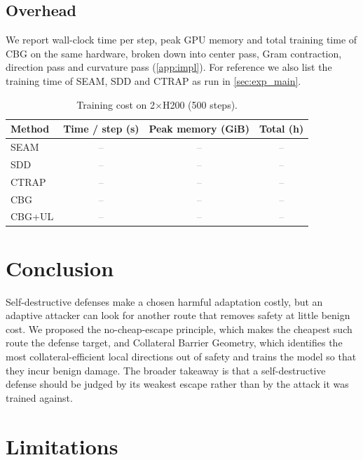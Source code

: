 \documentclass[11pt]{article}
\newcommand{\tbd}{\textcolor{gray}{--}}
\begin{document}
\subsection{Overhead}
\label{sec:overhead}

We report wall-clock time per step, peak GPU memory and total training time of CBG on the same hardware, broken down into center pass, Gram contraction, direction pass and curvature pass (\cref{app:impl}). For reference we also list the training time of SEAM, SDD and CTRAP as run in \cref{sec:exp_main}.

\begin{table}[t]
\centering
\small
\caption{Training cost on 2$\times$H200 (500 steps).}
\label{tab:overhead}
\begin{tabular}{lccc}
\toprule
Method & Time / step (s) & Peak memory (GiB) & Total (h)\\
\midrule
SEAM   & \tbd & \tbd & \tbd\\
SDD    & \tbd & \tbd & \tbd\\
CTRAP  & \tbd & \tbd & \tbd\\
CBG    & \tbd & \tbd & \tbd\\
CBG+UL & \tbd & \tbd & \tbd\\
\bottomrule
\end{tabular}
\end{table}





\section{Conclusion}
\label{sec:conclusion}

Self-destructive defenses make a chosen harmful adaptation costly, but an adaptive attacker can look for another route that removes safety at little benign cost. We proposed the no-cheap-escape principle, which makes the cheapest such route the defense target, and Collateral Barrier Geometry, which identifies the most collateral-efficient local directions out of safety and trains the model so that they incur benign damage. The broader takeaway is that a self-destructive defense should be judged by its weakest escape rather than by the attack it was trained against.

\section*{Limitations}
\end{document}

